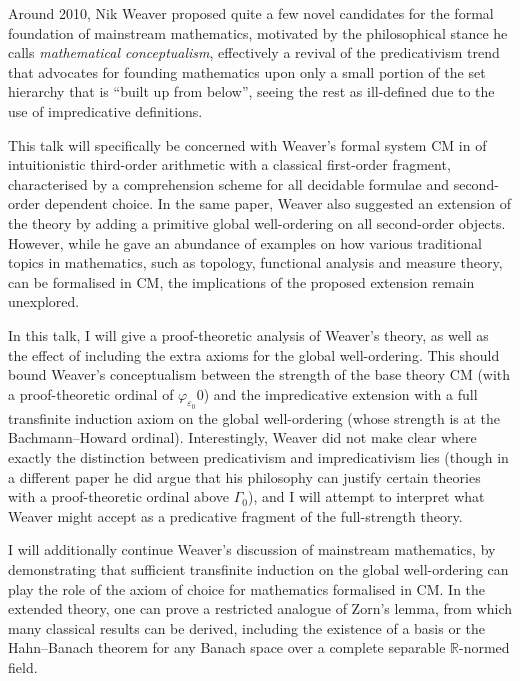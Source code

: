 \documentclass[bsl,meeting]{asl}
\newcommand{\NP}{}
\begin{document}
\thispagestyle{empty}

\NP
{}

Around 2010, Nik Weaver proposed quite a few novel candidates for the formal foundation of mainstream mathematics, motivated by the philosophical stance he calls \emph{mathematical conceptualism}, effectively a revival of the predicativism trend that advocates for founding mathematics upon only a small portion of the set hierarchy that is ``built up from below'', seeing the rest as ill-defined due to the use of impredicative definitions.

This talk will specifically be concerned with Weaver's formal system $\mathrm{CM}$ in \cite{weaver09-cm} of intuitionistic third-order arithmetic with a classical first-order fragment, characterised by a comprehension scheme for all decidable formulae and second-order dependent choice. In the same paper, Weaver also suggested an extension of the theory by adding a primitive global well-ordering on all second-order objects. However, while he gave an abundance of examples on how various traditional topics in mathematics, such as topology, functional analysis and measure theory, can be formalised in $\mathrm{CM}$, the implications of the proposed extension remain unexplored.

In this talk, I will give a proof-theoretic analysis of Weaver's theory, as well as the effect of including the extra axioms for the global well-ordering. This should bound Weaver's conceptualism between the strength of the base theory $\mathrm{CM}$ (with a proof-theoretic ordinal of $\varphi_{\varepsilon_0}0$) and the impredicative extension with a full transfinite induction axiom on the global well-ordering (whose strength is at the Bachmann--Howard ordinal). Interestingly, Weaver did not make clear where exactly the distinction between predicativism and impredicativism lies (though in a different paper \cite{weaver09-predicativity} he did argue that his philosophy can justify certain theories with a proof-theoretic ordinal above $\Gamma_0$), and I will attempt to interpret what Weaver might accept as a predicative fragment of the full-strength theory.

I will additionally continue Weaver's discussion of mainstream mathematics, by demonstrating that sufficient transfinite induction on the global well-ordering can play the role of the axiom of choice for mathematics formalised in $\mathrm{CM}$. In the extended theory, one can prove a restricted analogue of Zorn's lemma, from which many classical results can be derived, including the existence of a basis or the Hahn--Banach theorem for any Banach space over a complete separable $\mathbb{R}$-normed field.
\end{document}
